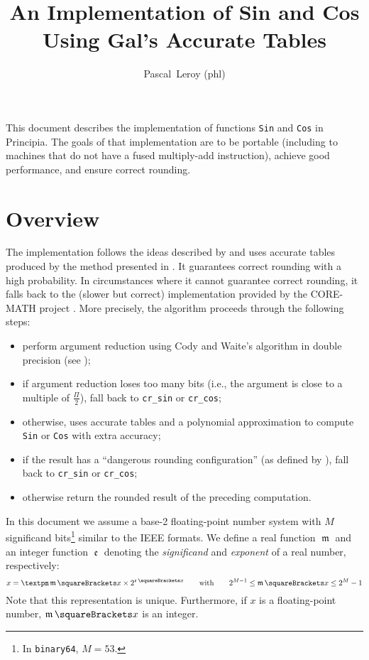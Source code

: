 \documentclass[10pt, a4paper, twoside]{basestyle}
\title{An Implementation of Sin and Cos Using Gal's Accurate Tables}
\date{\printdate{2025-02-02}}
\author{Pascal~Leroy (phl)}
\DeclareMathOperator{\mant}{\mathfrak m}
\DeclareMathOperator{\expn}{\mathfrak e}
\begin{document}
\maketitle
\begin{sloppypar}
\noindent
This document describes the implementation of functions \texttt{Sin} and \texttt{Cos} in Principia.  The goals of that implementation are to be portable (including to machines that do not have a fused multiply-add instruction), achieve good performance, and ensure correct rounding.
\end{sloppypar}

\section*{Overview}
The implementation follows the ideas described by \cite{GalBachelis1991} and uses accurate tables produced by the method presented in \cite{StehléZimmermann2005}.  It guarantees correct rounding with a high probability.  In circumstances where it cannot guarantee correct rounding, it falls back to the (slower but correct) implementation provided by the CORE-MATH project \cite{SibidanovZimmermannGlondu2022} \cite{ZimmermannSibidanovGlondu2024}.  More precisely, the algorithm proceeds through the following steps:
\begin{itemize}[nosep]
\item perform argument reduction using Cody and Waite's algorithm in double precision (see \cite[379]{MullerBrisebarreDeDinechinJeannerodLefevreMelquiondRevolStehleTorres2010});
\item if argument reduction loses too many bits (i.e., the argument is close to a multiple of $\frac{\Pi}{2}$), fall back to \texttt{cr\_sin} or \texttt{cr\_cos};
\item otherwise, uses accurate tables and a polynomial approximation to compute \texttt{Sin} or \texttt{Cos} with extra accuracy;
\item if the result has a ``dangerous rounding configuration'' (as defined by \cite{GalBachelis1991}), fall back to \texttt{cr\_sin} or \texttt{cr\_cos};
\item otherwise return the rounded result of the preceding computation.
\end{itemize}
In this document we assume a base-2 floating-point number system with $M$ significand bits\footnote{In \texttt{binary64}, $M = 53$.} similar to the IEEE formats.  We define a real  function $\mant$ and an integer function $\expn$ denoting the \emph{significand} and \emph{exponent} of a real number, respectively:
\[
x = ±\mant\of{x} \times 2^{\expn\of{x}} \qquad\text{with}\qquad 2^{M-1} \leq \mant\of{x} \leq 2^M - 1
\]
Note that this representation is unique.  Furthermore, if $x$ is a floating-point number, $\mant\of{x}$ is an integer.
\end{document}
